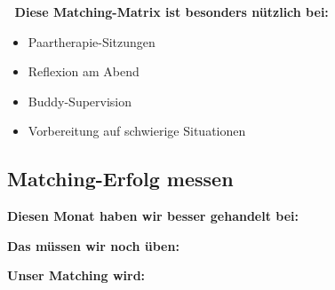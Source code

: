 \begin{tcolorbox}[colback=ctmmPurple!5!white,colframe=ctmmPurple,title=Verwendung]
📎 \textbf{Diese Matching-Matrix ist besonders nützlich bei:}
\begin{itemize}
  \item Paartherapie-Sitzungen
  \item Reflexion am Abend
  \item Buddy-Supervision
  \item Vorbereitung auf schwierige Situationen
\end{itemize}
\end{tcolorbox}

\subsection*{\textcolor{ctmmOrange}{Matching-Erfolg messen}}

\textbf{Diesen Monat haben wir besser gehandelt bei:}\\

\textbf{Das müssen wir noch üben:}\\

\textbf{Unser Matching wird:}   
